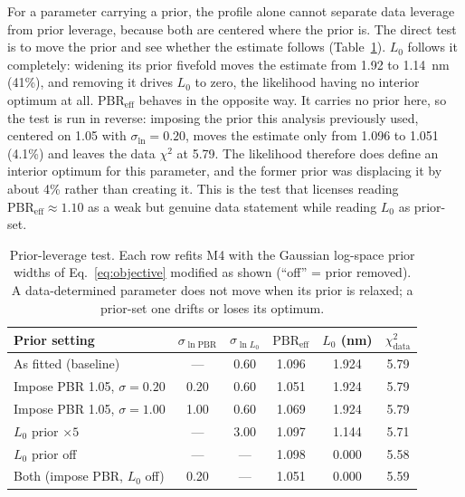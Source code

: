 \documentclass[a4paper,fleqn]{cas-sc}
\begin{document}
For a parameter carrying a prior, the profile alone cannot separate data
leverage from prior leverage, because both are centered where the prior
is. The direct test is to move the prior and see whether the estimate
follows (Table~\ref{tab:priortest}). $L_0$ follows it completely:
widening its prior fivefold moves the estimate from 1.92 to 1.14~nm
(41\%), and removing it drives $L_0$ to zero, the likelihood having no
interior optimum at all. $\mathrm{PBR}_\text{eff}$ behaves in the
opposite way. It carries no prior here, so the test is run in reverse:
imposing the prior this analysis previously used, centered on 1.05 with
$\sigma_{\ln} = 0.20$, moves the estimate only from 1.096 to 1.051
(4.1\%) and leaves the data $\chi^2$ at 5.79. The likelihood therefore
does define an interior optimum for this parameter, and the former prior
was displacing it by about 4\% rather than creating it. This is the test
that licenses reading $\mathrm{PBR}_\text{eff} \approx 1.10$ as a weak
but genuine data statement while reading $L_0$ as prior-set.

\begin{table}[htbp]
\centering
\caption{Prior-leverage test. Each row refits M4 with the Gaussian
log-space prior widths of Eq.~\eqref{eq:objective} modified as shown
(``off'' = prior removed). A data-determined parameter does not move when
its prior is relaxed; a prior-set one drifts or loses its optimum.}
\label{tab:priortest}
\small
\begin{tabular}{lccccc}
\toprule
Prior setting & $\sigma_{\ln \mathrm{PBR}}$ & $\sigma_{\ln L_0}$ & $\mathrm{PBR}_\text{eff}$ & $L_0$ (nm) & $\chi^2_\text{data}$ \\
\midrule
As fitted (baseline) & --- & 0.60 & 1.096 & 1.924 & 5.79 \\
Impose PBR 1.05, $\sigma=0.20$ & 0.20 & 0.60 & 1.051 & 1.924 & 5.79 \\
Impose PBR 1.05, $\sigma=1.00$ & 1.00 & 0.60 & 1.069 & 1.924 & 5.79 \\
$L_0$ prior $\times5$ & --- & 3.00 & 1.097 & 1.144 & 5.71 \\
$L_0$ prior off & --- & --- & 1.098 & 0.000 & 5.58 \\
Both (impose PBR, $L_0$ off) & 0.20 & --- & 1.051 & 0.000 & 5.59 \\
\bottomrule
\end{tabular}
\end{table}
\end{document}
